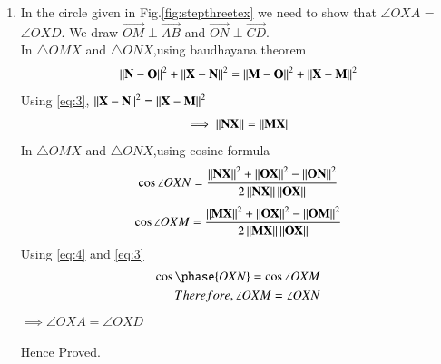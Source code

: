 \begin{enumerate}[label=\thesection.\arabic*.,ref=\thesection.\theenumi]
	The above \LaTeX{} code can be compiled as a standalone document as
	\begin{lstlisting}
	./figs/step3_standalone.tex
	\end{lstlisting}


\item In the circle given in Fig.\ref{fig:stepthreetex} we need to show that $\angle{OXA}$ = $\angle{OXD}$. We draw $\vec{OM} \perp \vec{AB}$ and $\vec{ON} \perp \vec{CD}$.\\
In $\triangle OMX$ and $\triangle ONX$,using baudhayana theorem
	\begin{align}
	\left\lVert\mathbf{N-O}\right\rVert^2 + \left\lVert\mathbf{X-N}\right\rVert^2 = \left\lVert\mathbf{M-O}\right\rVert^2 + \left\lVert\mathbf{X-M}\right\rVert^2
	\end{align}
	Using \eqref{eq:3}, $\left\lVert\mathbf{X-N}\right\rVert^2 = \left\lVert\mathbf{X-M}\right\rVert^2$\\
\begin{align}
	\implies \left\lVert\mathbf{NX}\right\rVert = \left\lVert\mathbf{MX}\right\rVert \label{eq:4}
\end{align}
In $\triangle OMX$ and $\triangle ONX$,using cosine formula\\
\begin{align}
\cos{\angle{OXN}} = \frac{  \left\lVert\mathbf{NX}\right\rVert^2 + \left\lVert\mathbf{OX}\right\rVert^2  - \left\lVert\mathbf{ON}\right\rVert^2     }{2\left\lVert\mathbf{NX}\right\rVert\left\lVert\mathbf{OX}\right\rVert}
\end{align}
\begin{align}
\cos{\angle{OXM}} = \frac{  \left\lVert\mathbf{MX}\right\rVert^2 + \left\lVert\mathbf{OX}\right\rVert^2  - \left\lVert\mathbf{OM}\right\rVert^2     }{2\left\lVert\mathbf{MX}\right\rVert\left\lVert\mathbf{OX}\right\rVert}
\end{align}
Using \eqref{eq:4} and \eqref{eq:3} 
\begin{align}
\cos{\phase{OXN}} = \cos{\angle{OXM}}
\\
	Therefore, \angle{OXM} = \angle{OXN}
\end{align}
	$\implies \angle{OXA} = \angle{OXD}$


Hence Proved.





\end{enumerate}




